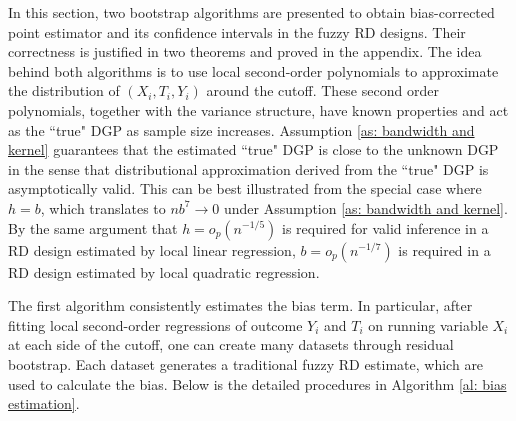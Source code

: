 \documentclass[12pt,]{article}
\DeclareMathOperator{\1}{\mathbbm{1}}
\begin{document}
In this section, two bootstrap algorithms are presented to obtain bias-corrected point estimator and its confidence intervals in the fuzzy RD designs. Their correctness is justified in two theorems and proved in the appendix. The idea behind both algorithms is to use local second-order polynomials to approximate the distribution of $(X_i, T_i, Y_i)$ around the cutoff. These second order polynomials, together with the variance structure, have known properties and act as the ``true" DGP as sample size increases. Assumption \ref{as: bandwidth and kernel} guarantees that the estimated ``true" DGP is close to the unknown DGP in the sense that distributional approximation derived from the ``true" DGP is asymptotically valid. This can be best illustrated from the special case where $h = b$, which translates to $nb^7 \to 0$ under Assumption \ref{as: bandwidth and kernel}. By the same argument that $h = o_p(n^{-1/5})$ is required for valid inference in a RD design estimated by local linear regression, $b = o_p(n^{-1/7})$ is required in a RD design estimated by local quadratic regression.

The first algorithm consistently estimates the bias term. In particular, after fitting local second-order regressions of outcome $Y_i$ and $T_i$ on running variable $X_i$ at each side of the cutoff, one can create many datasets through residual bootstrap. Each dataset generates a traditional fuzzy RD estimate, which are used to calculate the bias. Below is the detailed procedures in Algorithm \ref{al: bias estimation}.
\end{document}
